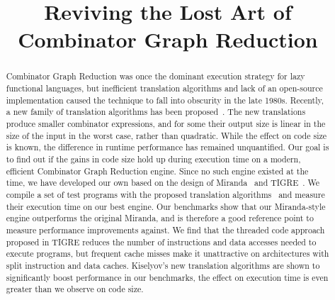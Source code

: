 \documentclass[conference]{IEEEtran}
\begin{document}
\title{Reviving the Lost Art of Combinator Graph Reduction}

\author{
}

\maketitle

\begin{abstract}
    Combinator Graph Reduction was once the dominant execution strategy for lazy functional languages, but inefficient translation algorithms and lack of an open-source implementation caused the technique to fall into obscurity in the late 1980s.
    Recently, a new family of translation algorithms has been proposed~\cite{kiselyov_lambda_2018}.
    The new translations produce smaller combinator expressions, and for some their output size is linear in the size of the input in the worst case, rather than quadratic.
    While the effect on code size is known, the difference in runtime performance has remained unquantified.
    Our goal is to find out if the gains in code size hold up during execution time on a modern, efficient Combinator Graph Reduction engine.
    Since no such engine existed at the time, we have developed our own based on the design of Miranda~\cite{turner_miranda_1985} and TIGRE~\cite{koopman_fresh_1989}.
    We compile a set of test programs with the proposed translation algorithms~\cite{kiselyov_lambda_2018} and measure their execution time on our best engine.
    Our benchmarks show that our Miranda-style engine outperforms the original Miranda, and is therefore a good reference point to measure performance improvements against.
    We find that the threaded code approach proposed in TIGRE reduces the number of instructions and data accesses needed to execute programs, but frequent cache misses make it unattractive on architectures with split instruction and data caches.
    Kiselyov's new translation algorithms are shown to significantly boost performance in our benchmarks, the effect on execution time is even greater than we observe on code size.

\end{abstract}
\end{document}
